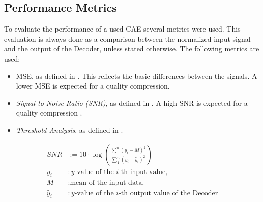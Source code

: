 \subsection{Performance Metrics} \label{sec:performanceMetrics}
To evaluate the performance of a used CAE several metrics were used. 
This evaluation is always done as a comparison between the normalized input signal and the output of the Decoder, unless stated otherwise.
The following metrics are used:
\begin{itemize}
	\item MSE, as defined in . This reflects the basic differences between the signals. A lower MSE is expected for a quality compression.
	\item \textit{Signal-to-Noise Ratio (SNR)}, as defined in . A high SNR is expected for a quality compression \cite{snrFormula}.
	\item \textit{Threshold Analysis}, as defined in .
\end{itemize}
\begin{equation}
	\begin{split}
		SNR &:= 10 \cdot \log(\frac{\sum_{1}^{n}(y_i - M)^2}{\sum_{1}^{n}(y_i - \tilde{y_i})^2}) \\
		y_i &: \text{$y$-value of the $i$-th input value,} \\
		M &: \text{mean of the input data,} \\
		\tilde{y_i} &: \text{$y$-value of the $i$-th output value of the Decoder}
	\end{split}
	\label{eq:snr}
\end{equation}

